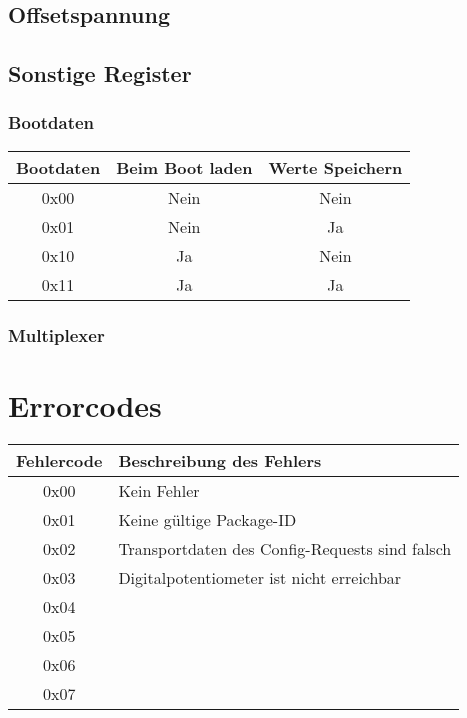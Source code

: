 \documentclass[a4paper,12pt]{article}
\begin{document}
\lstset{style=C}

\subsection{Offsetspannung}
\subsection{Sonstige Register}
\subsubsection{Bootdaten}

\begin{flushleft}
\begin{tabular}{c||c|c}
Bootdaten & Beim Boot laden & Werte Speichern\\
\hline
\hline
0x00 & Nein & Nein \\
\hline
0x01 & Nein & Ja\\
\hline
0x10 & Ja & Nein \\
\hline
0x11 & Ja & Ja \\
\end{tabular}
\end{flushleft}


\subsubsection{Multiplexer}
\section{Errorcodes}

\begin{flushleft}
\begin{tabular}{c||l}
Fehlercode & Beschreibung des Fehlers \\
\hline
\hline
0x00 & Kein Fehler \\
\hline
0x01 & Keine gültige Package-ID \\
\hline
0x02 & Transportdaten des Config-Requests sind falsch \\
\hline
0x03 & Digitalpotentiometer ist nicht erreichbar \\
\hline
0x04 &  \\
\hline
0x05 &  \\
\hline
0x06 &  \\
\hline
0x07 &  \\

\end{tabular}
\end{flushleft}
\end{document}
